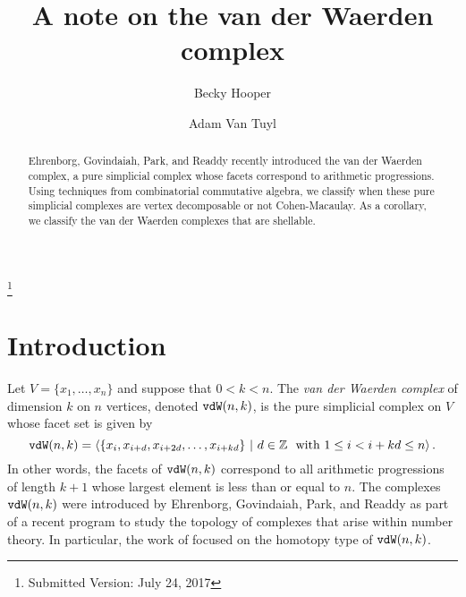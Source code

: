 \documentclass[12pt]{amsart}
\numberwithin{equation}{section}
\theoremstyle{definition}
\begin{document}

\newcommand{\del}{\operatorname{del}}
\newcommand{\lk}{\operatorname{lk}}
\newcommand{\reg}{\operatorname{reg}}
\newcommand{\pd}{\operatorname{pd}}


 
\title[]
{A note on the van der Waerden complex}
\thanks{Submitted Version: July 24, 2017}

\author{Becky Hooper}
\address{Department of Mathematics and Statistics\\
McMaster University, Hamilton, ON, L8S 4L8}
 
\author{Adam Van Tuyl}
\address{Department of Mathematics and Statistics\\
McMaster University, Hamilton, ON, L8S 4L8}
 
 
 
\begin{abstract}
Ehrenborg, Govindaiah, Park, and Readdy recently introduced
the van der Waerden complex, 
a pure simplicial complex whose facets correspond to arithmetic
progressions.  Using techniques from combinatorial commutative
algebra, we classify when these pure simplicial complexes
are vertex decomposable or not Cohen-Macaulay.  As a corollary,
we classify the van der Waerden complexes that are shellable. 
\end{abstract}
 
\maketitle


\section{Introduction} 

Let $V = \{x_1,\ldots,x_n\}$ and suppose that $0 < k < n$.  The
{\it van der Waerden complex} of dimension $k$ on $n$
vertices, denoted ${\tt vdW}(n,k)$, is the pure simplicial
complex on $V$ whose facet set is given by 
\[{\tt vdW}(n,k) = 
\left\langle \{x_i,x_{i+d},x_{i+2d},\allowbreak \ldots,x_{i+kd}\}
~|~ d\in\mathbb{Z} ~~\mbox{with $1\leq i<i+kd\leq n$} \right\rangle.\]
In other words, the facets of ${\tt vdW}(n,k)$ correspond to
all arithmetic progressions of length $k+1$ whose largest element is
less than or equal to $n$.   The complexes ${\tt vdW}(n,k)$ 
were introduced by Ehrenborg, Govindaiah, Park, and Readdy \cite{EGPR}
as part of a recent program to study the topology of complexes that arise
within number theory.   In particular, the work of \cite{EGPR} focused on the
homotopy type of ${\tt vdW}(n,k)$.
\end{document}
